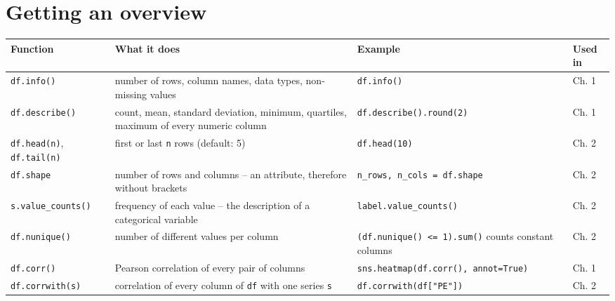 \documentclass[
  letterpaper,
  DIV=11,
  numbers=noendperiod]{scrreprt}
\begin{document}
\section{Getting an overview}\label{getting-an-overview}

\begin{longtable}[]{@{}
  >{\raggedright\arraybackslash}p{}
  >{\raggedright\arraybackslash}p{}
  >{\raggedright\arraybackslash}p{}
  >{\raggedright\arraybackslash}p{}@{}}
\toprule\noalign{}
\begin{minipage}[b]{\linewidth}\raggedright
Function
\end{minipage} & \begin{minipage}[b]{\linewidth}\raggedright
What it does
\end{minipage} & \begin{minipage}[b]{\linewidth}\raggedright
Example
\end{minipage} & \begin{minipage}[b]{\linewidth}\raggedright
Used in
\end{minipage} \\
\midrule\noalign{}
\endhead
\bottomrule\noalign{}
\endlastfoot
\texttt{df.info()} & number of rows, column names, data types,
non-missing values & \texttt{df.info()} & Ch. 1 \\
\texttt{df.describe()} & count, mean, standard deviation, minimum,
quartiles, maximum of every numeric column &
\texttt{df.describe().round(2)} & Ch. 1 \\
\texttt{df.head(n)}, \texttt{df.tail(n)} & first or last \texttt{n} rows
(default: 5) & \texttt{df.head(10)} & Ch. 2 \\
\texttt{df.shape} & number of rows and columns -- an attribute,
therefore without brackets & \texttt{n\_rows,\ n\_cols\ =\ df.shape} &
Ch. 2 \\
\texttt{s.value\_counts()} & frequency of each value -- the description
of a categorical variable & \texttt{label.value\_counts()} & Ch. 2 \\
\texttt{df.nunique()} & number of different values per column &
\texttt{(df.nunique()\ \textless{}=\ 1).sum()} counts constant columns &
Ch. 2 \\
\texttt{df.corr()} & Pearson correlation of every pair of columns &
\texttt{sns.heatmap(df.corr(),\ annot=True)} & Ch. 1 \\
\texttt{df.corrwith(s)} & correlation of every column of \texttt{df}
with one series \texttt{s} & \texttt{df.corrwith(df{[}"PE"{]})} & Ch.
2 \\
\end{longtable}
\end{document}
